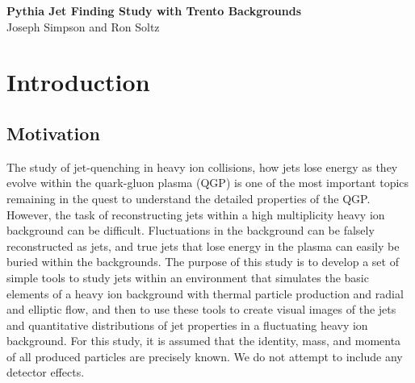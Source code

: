 \documentclass[11pt]{article}
\begin{document}
%
%
\newcommand{\zapspace}{\topsep=1pt\partopsep=1pt\itemsep=1pt\parskip=2pt}
\newcommand{\trento}{\mbox{T$_{\rm R}$ENTo}}

\begin{center}
{\Large \bf Pythia Jet Finding Study with Trento Backgrounds\\}
\bigskip
Joseph Simpson and Ron Soltz
\end{center}

\begin{abstract}
We present results applying the Pythia SlowJet Finder to Pythia generated QCD and QED hard processes in the presence of simulated heavy ion backgrounds.  The hard process events are generated with Pythia version~8.219 for $\sqrt{s}$200~GeV proton-proton collisions and the backgrounds are generated by the Reduced Thickness Event-by-event Nuclear Topology model \trento\ for Au-Au collisions with a nucleon-nucleon cross-section of 4.23~fm$^2$.  The \trento\ model is used to determine the initial entropy and ellipticity from which the total charged particle multiplicity and elliptic flow are determined.  We report results in the form of event displays, total $p_T$ distributions, and fragmentation distributions for SlowJet applied to Pythia events with and without the simulated heavy ion backgrounds.
\end{abstract}

\tableofcontents

\newpage 

\section{Introduction}
\subsection*{Motivation}

The study of jet-quenching in heavy ion collisions, how jets lose energy as they evolve within the quark-gluon plasma (QGP) is one of the most important topics remaining in the quest to understand the detailed properties of the QGP.  However, the task of reconstructing jets within a high multiplicity heavy ion background can be difficult.  Fluctuations in the background can be falsely reconstructed as jets, and true jets that lose energy in the plasma can easily be buried within the backgrounds.  The purpose of this study is to develop a set of simple tools to study jets within an environment that simulates the basic elements of a heavy ion background with thermal particle production and radial and elliptic flow, and then to use these tools to create visual images of the jets and quantitative distributions of jet properties in a fluctuating heavy ion background.  For this study, it is assumed that the identity, mass, and momenta of all produced particles are precisely known.  We do not attempt to include any detector effects.
\end{document}
